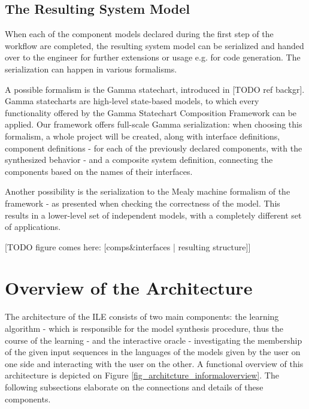 \subsection{The Resulting System Model} \label{subs_resultingmodel}
When each of the component models declared during the first step of the workflow are completed, the resulting system model can be serialized and handed over to the engineer for further extensions or usage e.g. for code generation. The serialization can happen in various formalisms.

A possible formalism is the Gamma statechart, introduced in [TODO ref backgr]. Gamma statecharts are high-level state-based models, to which every functionality offered by the Gamma Statechart Composition Framework can be applied. Our framework offers full-scale Gamma serialization: when choosing this formalism, a whole project will be created, along with interface definitions, component definitions - for each of the previously declared components, with the synthesized behavior - and a composite system definition, connecting the components based on the names of their interfaces.

Another possibility is the serialization to the Mealy machine formalism of the framework - as presented when checking the correctness of the model. This results in a lower-level set of independent models, with a completely different set of applications.

[TODO figure comes here: [comps\&interfaces | resulting structure]]
\clearpage
\section{Overview of the Architecture} \label{sec_architecture}

The architecture of the ILE consists of two main components: the learning algorithm - which is responsible for the model synthesis procedure, thus the course of the learning - and the interactive oracle - investigating the membership of the given input sequences in the languages of the models given by the user on one side and interacting with the user on the other. A functional overview of this architecture is depicted on Figure \ref{fig_architcture_informaloverview}. The following subsections elaborate on the connections and details of these components.

